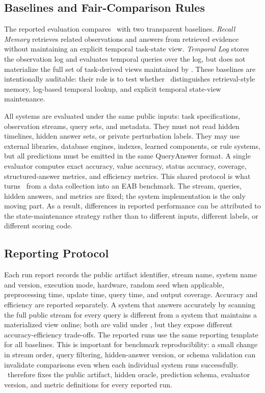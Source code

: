 \subsection{Baselines and Fair-Comparison Rules}

The reported evaluation compares \engine\ with two transparent baselines. \emph{Recall Memory} retrieves related observations and answers from retrieved evidence without maintaining an explicit temporal task-state view. \emph{Temporal Log} stores the observation log and evaluates temporal queries over the log, but does not materialize the full set of task-derived views maintained by \engine. These baselines are intentionally auditable: their role is to test whether \bench\ distinguishes retrieval-style memory, log-based temporal lookup, and explicit temporal state-view maintenance.

All systems are evaluated under the same public inputs: task specifications, observation streams, query sets, and metadata. They must not read hidden timelines, hidden answer sets, or private perturbation labels. They may use external libraries, database engines, indexes, learned components, or rule systems, but all predictions must be emitted in the same QueryAnswer format. A single evaluator computes exact accuracy, value accuracy, status accuracy, coverage, structured-answer metrics, and efficiency metrics.
This shared protocol is what turns \bench\ from a data collection into an EAB benchmark. The stream, queries, hidden answers, and metrics are fixed; the system implementation is the only moving part. As a result, differences in reported performance can be attributed to the state-maintenance strategy rather than to different inputs, different labels, or different scoring code.

\subsection{Reporting Protocol}

Each run report records the public artifact identifier, stream name, system name and version, execution mode, hardware, random seed when applicable, preprocessing time, update time, query time, and output coverage. Accuracy and efficiency are reported separately. A system that answers accurately by scanning the full public stream for every query is different from a system that maintains a materialized view online; both are valid under \bench, but they expose different accuracy-efficiency trade-offs.
The reported runs use the same reporting template for all baselines. This is important for benchmark reproducibility: a small change in stream order, query filtering, hidden-answer version, or schema validation can invalidate comparisons even when each individual system runs successfully. \bench\ therefore fixes the public artifact, hidden oracle, prediction schema, evaluator version, and metric definitions for every reported run.


